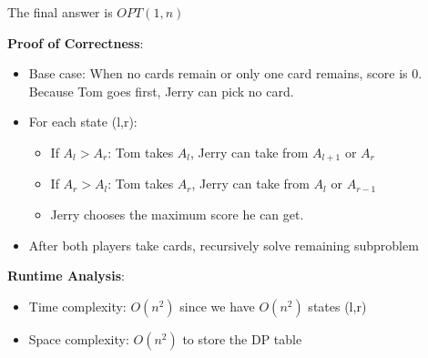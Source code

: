 \begin{parts}
\begin{solution}
    The final answer is $OPT(1,n)$

    \textbf{Proof of Correctness}: 

    \begin{itemize}
        \item Base case: When no cards remain or only one card remains, score is 0. Because Tom goes first, Jerry can pick no card.
        \item For each state (l,r):
            \begin{itemize}
                \item If $A_l > A_r$: Tom takes $A_l$, Jerry can take from $A_{l+1}$ or $A_r$
                \item If $A_r > A_l$: Tom takes $A_r$, Jerry can take from $A_l$ or $A_{r-1}$
                \item Jerry chooses the maximum score he can get.
            \end{itemize}
        \item After both players take cards, recursively solve remaining subproblem
    \end{itemize}

    \textbf{Runtime Analysis}: 

    \begin{itemize}
        \item Time complexity: $O(n^2)$ since we have $O(n^2)$ states (l,r)
        \item Space complexity: $O(n^2)$ to store the DP table
    \end{itemize}
\end{solution}
\end{parts}
